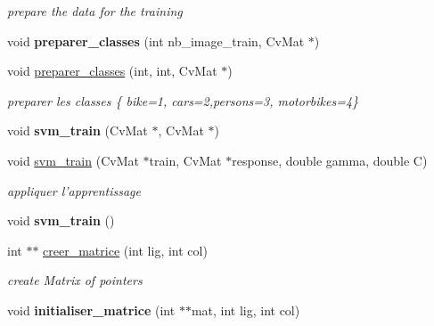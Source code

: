 \begin{DoxyCompactItemize}
\begin{DoxyCompactList}\small\item\em prepare the data for the training \end{DoxyCompactList}\item 
\hypertarget{classmysvm_a84b73e6b3f3187c14e2d5929ef601c9a}{
void {\bfseries preparer\_\-classes} (int nb\_\-image\_\-train, CvMat $\ast$)}
\label{classmysvm_a84b73e6b3f3187c14e2d5929ef601c9a}

\item 
\hypertarget{classmysvm_ab0f3cb8577a6a81856c9e54f0ff1c18d}{
void \hyperlink{classmysvm_ab0f3cb8577a6a81856c9e54f0ff1c18d}{preparer\_\-classes} (int, int, CvMat $\ast$)}
\label{classmysvm_ab0f3cb8577a6a81856c9e54f0ff1c18d}

\begin{DoxyCompactList}\small\item\em preparer les classes \{ bike=1, cars=2,persons=3, motorbikes=4\} \end{DoxyCompactList}\item 
\hypertarget{classmysvm_ac43a2df7c8397bad82f3338fff4ef29e}{
void {\bfseries svm\_\-train} (CvMat $\ast$, CvMat $\ast$)}
\label{classmysvm_ac43a2df7c8397bad82f3338fff4ef29e}

\item 
\hypertarget{classmysvm_aaa966f0599178c7f369f6e6a23302680}{
void \hyperlink{classmysvm_aaa966f0599178c7f369f6e6a23302680}{svm\_\-train} (CvMat $\ast$train, CvMat $\ast$response, double gamma, double C)}
\label{classmysvm_aaa966f0599178c7f369f6e6a23302680}

\begin{DoxyCompactList}\small\item\em appliquer l'apprentissage \end{DoxyCompactList}\item 
\hypertarget{classmysvm_adbff5721c400c283d87d7dc810f05aad}{
void {\bfseries svm\_\-train} ()}
\label{classmysvm_adbff5721c400c283d87d7dc810f05aad}

\item 
\hypertarget{classmysvm_a23489b7b25f60cd6f30a1adf36ea9f7b}{
int $\ast$$\ast$ \hyperlink{classmysvm_a23489b7b25f60cd6f30a1adf36ea9f7b}{creer\_\-matrice} (int lig, int col)}
\label{classmysvm_a23489b7b25f60cd6f30a1adf36ea9f7b}

\begin{DoxyCompactList}\small\item\em create Matrix of pointers \end{DoxyCompactList}\item 
\hypertarget{classmysvm_a1145343460aa721ca528ec71354ff24b}{
void {\bfseries initialiser\_\-matrice} (int $\ast$$\ast$mat, int lig, int col)}
\label{classmysvm_a1145343460aa721ca528ec71354ff24b}


\end{DoxyCompactItemize}
